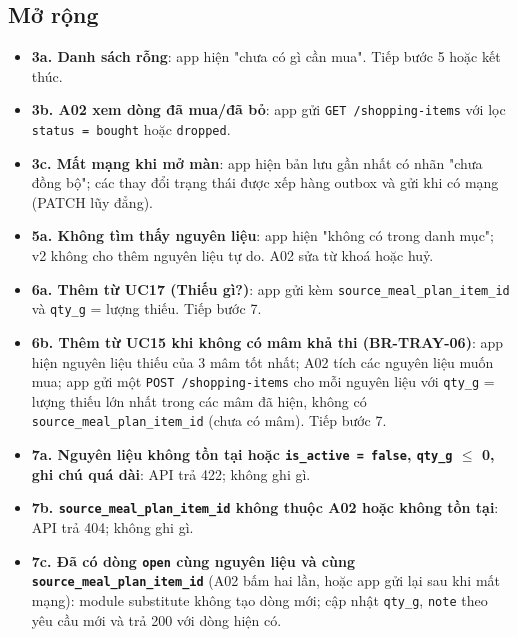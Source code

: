 \subsection{Mở rộng}
\begin{itemize}
\item \textbf{3a. Danh sách rỗng}: app hiện "chưa có gì cần mua". Tiếp bước 5 hoặc kết thúc.
\item \textbf{3b. A02 xem dòng đã mua/\allowbreak{}đã bỏ}: app gửi {\small\texttt{GET /\allowbreak{}\allowbreak{}shopping-\allowbreak{}items}} với lọc {\small\texttt{status = bought}} hoặc {\small\texttt{dropped}}.
\item \textbf{3c. Mất mạng khi mở màn}: app hiện bản lưu gần nhất có nhãn "chưa đồng bộ"; các thay đổi trạng thái được xếp hàng outbox và gửi khi có mạng (PATCH lũy đẳng).
\item \textbf{5a. Không tìm thấy nguyên liệu}: app hiện "không có trong danh mục"; v2 không cho thêm nguyên liệu tự do. A02 sửa từ khoá hoặc huỷ.
\item \textbf{6a. Thêm từ UC17 (Thiếu gì?)}: app gửi kèm {\small\texttt{source\_\allowbreak{}\allowbreak{}meal\_\allowbreak{}\allowbreak{}plan\_\allowbreak{}\allowbreak{}item\_\allowbreak{}\allowbreak{}id}} và {\small\texttt{qty\_\allowbreak{}\allowbreak{}g}} = lượng thiếu. Tiếp bước 7.
\item \textbf{6b. Thêm từ UC15 khi không có mâm khả thi (BR-\allowbreak{}TRAY-\allowbreak{}06)}: app hiện nguyên liệu thiếu của 3 mâm tốt nhất; A02 tích các nguyên liệu muốn mua; app gửi một {\small\texttt{POST /\allowbreak{}\allowbreak{}shopping-\allowbreak{}items}} cho mỗi nguyên liệu với {\small\texttt{qty\_\allowbreak{}\allowbreak{}g}} = lượng thiếu lớn nhất trong các mâm đã hiện, không có {\small\texttt{source\_\allowbreak{}\allowbreak{}meal\_\allowbreak{}\allowbreak{}plan\_\allowbreak{}\allowbreak{}item\_\allowbreak{}\allowbreak{}id}} (chưa có mâm). Tiếp bước 7.
\item \textbf{7a. Nguyên liệu không tồn tại hoặc {\small\texttt{is\_\allowbreak{}\allowbreak{}active = false}}, {\small\texttt{qty\_\allowbreak{}\allowbreak{}g}} \ensuremath{\leq} 0, ghi chú quá dài}: API trả 422; không ghi gì.
\item \textbf{7b. {\small\texttt{source\_\allowbreak{}\allowbreak{}meal\_\allowbreak{}\allowbreak{}plan\_\allowbreak{}\allowbreak{}item\_\allowbreak{}\allowbreak{}id}} không thuộc A02 hoặc không tồn tại}: API trả 404; không ghi gì.
\item \textbf{7c. Đã có dòng {\small\texttt{open}} cùng nguyên liệu và cùng {\small\texttt{source\_\allowbreak{}\allowbreak{}meal\_\allowbreak{}\allowbreak{}plan\_\allowbreak{}\allowbreak{}item\_\allowbreak{}\allowbreak{}id}}} (A02 bấm hai lần, hoặc app gửi lại sau khi mất mạng): module substitute không tạo dòng mới; cập nhật {\small\texttt{qty\_\allowbreak{}\allowbreak{}g}}, {\small\texttt{note}} theo yêu cầu mới và trả 200 với dòng hiện có.

\end{itemize}
